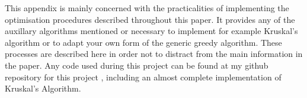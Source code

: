 \documentclass[../main.tex]{subfiles}
\begin{document}
This appendix is mainly concerned with the practicalities of implementing the optimisation procedures described throughout this paper. It provides any of the auxillary algorithms mentioned or necessary to implement for example Kruskal's algorithm or to adapt your own form of the generic greedy algorithm. These processes are described here in order not to distract from the main information in the paper.  Any code used during this project can be found at my github repository for this project \cite{github}, including an almost complete implementation of Kruskal's Algorithm.
\end{document}
